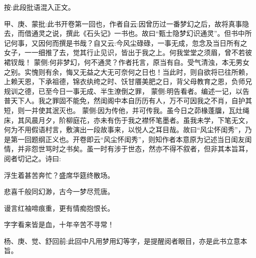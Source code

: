 
\begin{parag}
    \begin{note} \begin{subnote} 按:此段批语混入正文。\end{subnote}
        甲、庚、蒙批:此书开卷第一回也，作者自云:因曾历过一番梦幻之后，故将真事隐去，而借通灵之说，撰此《石头记》一书也。故曰“甄士隐梦幻识通灵”。但书中所记何事，又因何而撰是书哉？自又云:今风尘碌碌，一事无成，忽念及当日所有之女子，一一细推了去，觉其行止见识，皆出于我之上。何我堂堂之须眉，曾不若彼裙钗哉！ 蒙侧:何非梦幻，何不通灵？作者托言，原当有自。受气清浊，本无男女之别。实愧则有余，悔又无益之大无可奈何之日也！当此时，则自欲将已往所赖，上赖天恩，下承祖德，锦衣纨绔之时、饫甘餍美肥之日，背父母教育之恩，负师兄规训之德，已至今日一事无成、半生潦倒之罪， 蒙侧:明告看者。编述一记，以告普天下人。我之罪固不能免，然闺阁中本自历历有人，万不可因我之不肖，自护其短，则一并使其泯灭也。 蒙侧:因为传他，并可传我。虽今日之茆椽蓬牖，瓦灶绳床，其风晨月夕，阶柳庭花，亦未有伤于我之襟怀笔墨者。虽我未学，下笔无文，何为不用假语村言，敷演出一段故事来，以悦人之耳目哉。故曰“风尘怀闺秀”，乃是第一回题纲正义也。开卷即云“风尘怀闺秀”，则知作者本意原为记述当日闺友闺情，并非怨世骂时之书矣。虽一时有涉于世态，然亦不得不叙者，但非其本旨耳，阅者切记之。诗曰:
    \end{note}



    \begin{poem}
        \color{Mahogany}
        \begin{pl}浮生着甚苦奔忙？盛席华筵终散场。\end{pl}

        \begin{pl}悲喜千般同幻渺，古今一梦尽荒唐。\end{pl}

        \begin{pl}谩言红袖啼痕重，更有情痴抱恨长。\end{pl}

        \begin{pl}字字看来皆是血，十年辛苦不寻常！\end{pl}
    \end{poem}

\end{parag}

\begin{parag}
    \begin{note}杨、庚、觉、舒回前:此回中凡用梦用幻等字，是提醒阅者眼目，亦是此书立意本旨。\end{note}

\end{parag}


